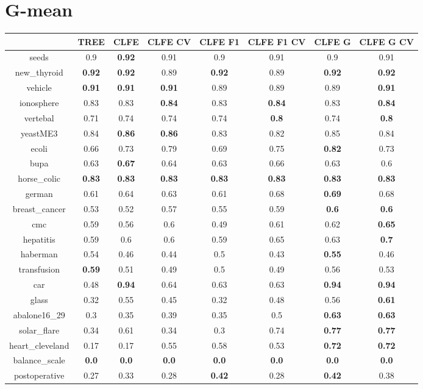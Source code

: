 \documentclass{article}%
\begin{document}
%
\section*{G{-}mean}%
\begin{tabular}{c|ccccccc}%
\hline%
&TREE&CLFE&CLFE CV&CLFE F1&CLFE F1 CV&CLFE G&CLFE G CV\\%
\hline%
seeds&0.9&\textbf{0.92}&0.91&0.9&0.91&0.9&0.91\\%
new\_thyroid&\textbf{0.92}&\textbf{0.92}&0.89&\textbf{0.92}&0.89&\textbf{0.92}&\textbf{0.92}\\%
vehicle&\textbf{0.91}&\textbf{0.91}&\textbf{0.91}&0.89&0.89&0.89&\textbf{0.91}\\%
ionosphere&0.83&0.83&\textbf{0.84}&0.83&\textbf{0.84}&0.83&\textbf{0.84}\\%
vertebal&0.71&0.74&0.74&0.74&\textbf{0.8}&0.74&\textbf{0.8}\\%
yeastME3&0.84&\textbf{0.86}&\textbf{0.86}&0.83&0.82&0.85&0.84\\%
ecoli&0.66&0.73&0.79&0.69&0.75&\textbf{0.82}&0.73\\%
bupa&0.63&\textbf{0.67}&0.64&0.63&0.66&0.63&0.6\\%
horse\_colic&\textbf{0.83}&\textbf{0.83}&\textbf{0.83}&\textbf{0.83}&\textbf{0.83}&\textbf{0.83}&\textbf{0.83}\\%
german&0.61&0.64&0.63&0.61&0.68&\textbf{0.69}&0.68\\%
breast\_cancer&0.53&0.52&0.57&0.55&0.59&\textbf{0.6}&\textbf{0.6}\\%
cmc&0.59&0.56&0.6&0.49&0.61&0.62&\textbf{0.65}\\%
hepatitis&0.59&0.6&0.6&0.59&0.65&0.63&\textbf{0.7}\\%
haberman&0.54&0.46&0.44&0.5&0.43&\textbf{0.55}&0.46\\%
transfusion&\textbf{0.59}&0.51&0.49&0.5&0.49&0.56&0.53\\%
car&0.48&\textbf{0.94}&0.64&0.63&0.63&\textbf{0.94}&\textbf{0.94}\\%
glass&0.32&0.55&0.45&0.32&0.48&0.56&\textbf{0.61}\\%
abalone16\_29&0.3&0.35&0.39&0.35&0.5&\textbf{0.63}&\textbf{0.63}\\%
solar\_flare&0.34&0.61&0.34&0.3&0.74&\textbf{0.77}&\textbf{0.77}\\%
heart\_cleveland&0.17&0.17&0.55&0.58&0.53&\textbf{0.72}&\textbf{0.72}\\%
balance\_scale&\textbf{0.0}&\textbf{0.0}&\textbf{0.0}&\textbf{0.0}&\textbf{0.0}&\textbf{0.0}&\textbf{0.0}\\%
postoperative&0.27&0.33&0.28&\textbf{0.42}&0.28&\textbf{0.42}&0.38\\%
\end{tabular}

%
\end{document}
